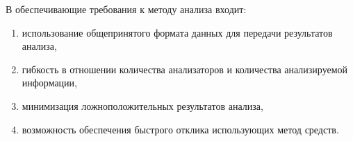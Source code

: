 В обеспечивающие требования к методу анализа входит:
\begin{enumerate}[1)]
    \item использование общепринятого формата данных для передачи результатов анализа,
    \item гибкость в отношении количества анализаторов и количества анализируемой информации,
    \item минимизация ложноположительных результатов анализа,
    \item возможность обеспечения быстрого отклика использующих метод средств.
\end{enumerate}


\clearpage
